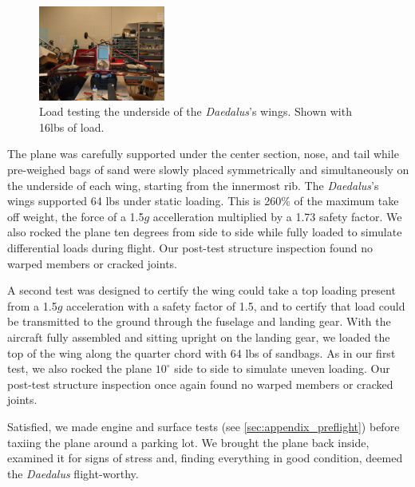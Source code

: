 \documentclass[pdftex,10pt,letter]{article}
\newcommand{\degrees}[1]
{
\begin{math}
#1^{\circ} 
\end{math}
}
\begin{document}
 \begin{figure}
	\includegraphics[width=0.37\textwidth]{../images/daedalus_sandbagtest.jpg}
	\caption{Load testing the underside of the \emph{Daedalus}'s wings. Shown with 16lbs of load.}
	\label{fig:sandbagtest}
\end{figure}
The plane was carefully supported under the center section, nose, and tail while pre-weighed bags of sand were slowly placed symmetrically and simultaneously on the underside of each wing, starting from the innermost rib.  The \emph{Daedalus}'s wings supported 64 lbs under static loading. This is 260\% of the maximum take off weight, the force of a 1.5$g$ accelleration multiplied by a 1.73 safety factor.  We also rocked the plane ten degrees from side to side while fully loaded to simulate differential loads during flight. Our post-test structure inspection found no warped members or cracked joints.

A second test was designed to certify the wing could take a top loading present from a 1.5$g$ acceleration with a safety factor of 1.5, and to certify that load could be transmitted to the ground through the fuselage and landing gear. With the aircraft fully assembled and sitting upright on the landing gear, we loaded the top of the wing along the quarter chord with 64 lbs of sandbags. As in our first test, we also rocked the plane \degrees{10} side to side to simulate uneven loading. Our post-test structure inspection once again found no warped members or cracked joints.

Satisfied, we made engine and surface tests (see \ref{sec:appendix_preflight}) before taxiing the plane around a parking lot.  We brought the plane back inside, examined it for signs of stress and, finding everything in good condition, deemed the \emph{Daedalus} flight-worthy.
\end{document}
